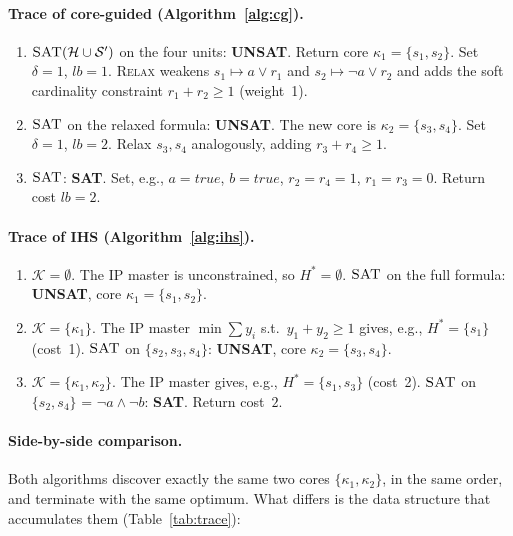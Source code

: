 \documentclass[11pt,a4paper]{article}
\begin{document}
\paragraph{Trace of core-guided (Algorithm~\ref{alg:cg}).}
\begin{enumerate}
\item $\textsc{SAT}(\mathcal{H} \cup \mathcal{S}')$ on the four units:
\textbf{UNSAT}. Return core $\kappa_1 = \{s_1, s_2\}$. Set
$\delta = 1$, $\mathit{lb} = 1$. \textsc{Relax} weakens
$s_1 \mapsto a \vee r_1$ and $s_2 \mapsto \neg a \vee r_2$ and adds the soft
cardinality constraint $r_1 + r_2 \geq 1$ (weight~1).
\item $\textsc{SAT}$ on the relaxed formula: \textbf{UNSAT}. The new core
is $\kappa_2 = \{s_3, s_4\}$. Set $\delta = 1$, $\mathit{lb} = 2$. Relax
$s_3, s_4$ analogously, adding $r_3 + r_4 \geq 1$.
\item $\textsc{SAT}$: \textbf{SAT}. Set, e.g., $a = \mathit{true}$,
$b = \mathit{true}$, $r_2 = r_4 = 1$, $r_1 = r_3 = 0$. Return cost
$\mathit{lb} = 2$.
\end{enumerate}

\paragraph{Trace of IHS (Algorithm~\ref{alg:ihs}).}
\begin{enumerate}
\item $\mathcal{K} = \emptyset$. The IP master is unconstrained, so $H^* =
\emptyset$. $\textsc{SAT}$ on the full formula: \textbf{UNSAT}, core
$\kappa_1 = \{s_1, s_2\}$.
\item $\mathcal{K} = \{\kappa_1\}$. The IP master $\min\sum y_i$ s.t.\
$y_1 + y_2 \geq 1$ gives, e.g., $H^* = \{s_1\}$ (cost~1). $\textsc{SAT}$ on
$\{s_2, s_3, s_4\}$: \textbf{UNSAT}, core $\kappa_2 = \{s_3, s_4\}$.
\item $\mathcal{K} = \{\kappa_1, \kappa_2\}$. The IP master gives, e.g.,
$H^* = \{s_1, s_3\}$ (cost~2). $\textsc{SAT}$ on $\{s_2, s_4\}$ = $\neg a
\wedge \neg b$: \textbf{SAT}. Return cost~$2$.
\end{enumerate}

\paragraph{Side-by-side comparison.} Both algorithms discover exactly the
same two cores $\{\kappa_1, \kappa_2\}$, in the same order, and terminate with
the same optimum. What differs is the data structure that accumulates them
(Table~\ref{tab:trace}):
\end{document}
